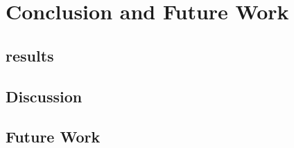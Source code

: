 \chapter{Conclusion and Future Work}\label{chapter:conclusion}

\section{results}
\section{Discussion}
\section{Future Work}